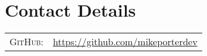 \section{Contact Details}\label{sec:contact-details}

\begin{tabular}{rl}
    \textsc{GitHub:}	& \href{https://github.com/mikeporterdev/}{https://github.com/mikeporterdev} 
\end{tabular}